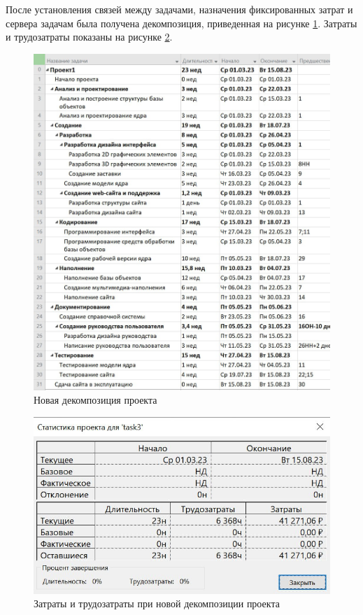 После установления связей между задачами, назначения фиксированных затрат и сервера задачам была получена декомпозиция, приведенная на рисунке \ref{img:new-decomposition}. Затраты и трудозатраты показаны на рисунке \ref{img:stat1}.

\begin{figure}[H]
	\begin{center}
		\includegraphics[scale=0.3]{inc/img/new-decomposition.jpg}
	\end{center}
	\captionsetup{justification=centering}
	\caption{Новая декомпозиция проекта}
	\label{img:new-decomposition}
\end{figure}

\begin{figure}[H]
	\begin{center}
		\includegraphics[scale=0.4]{inc/img/stat1.jpg}
	\end{center}
	\captionsetup{justification=centering}
	\caption{Затраты и трудозатраты при новой декомпозиции проекта}
	\label{img:stat1}
\end{figure}

